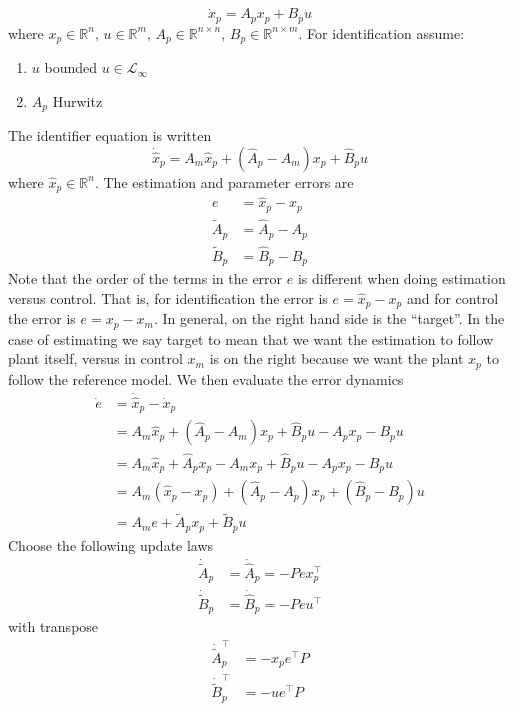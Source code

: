 \begin{equation*}
  \dot{x}_{p}=A_{p}x_{p}+B_{p}u
\end{equation*}
where $x_{p}\in\mathbb{R}^{n}$, $u\in\mathbb{R}^{m}$, $A_{p}\in\mathbb{R}^{n\times n}$, $B_{p}\in\mathbb{R}^{n\times m}$.
For identification assume:
\begin{enumerate}
  \setlength{\itemsep}{0pt}
  \item{$u$ bounded $u\in\mathcal{L}_{\infty}$}
  \item{$A_{p}$ Hurwitz}
\end{enumerate}
The identifier equation is written
\begin{equation*}
  \dot{\hat{x}}_{p}=A_{m}\hat{x}_{p}+(\hat{A}_{p}-A_{m})x_{p}+\hat{B}_{p}u
\end{equation*}
where $\hat{x}_{p}\in\mathbb{R}^{n}$.
The estimation and parameter errors are
\begin{align*}
  e&=\hat{x}_{p}-x_{p} \\
  \tilde{A}_{p}&=\hat{A}_{p}-A_{p} \\
  \tilde{B}_{p}&=\hat{B}_{p}-B_{p}
\end{align*}
Note that the order of the terms in the error $e$ is different when doing estimation versus control.
That is, for identification the error is $e=\hat{x}_{p}-x_{p}$ and for control the error is $e=x_{p}-x_{m}$.
In general, on the right hand side is the ``target''.
In the case of estimating we say target to mean that we want the estimation to follow plant itself, versus in control $x_{m}$ is on the right because we want the plant $x_{p}$ to follow the reference model.
We then evaluate the error dynamics
\begin{align*}
  \dot{e}&=\dot{\hat{x}}_{p}-\dot{x}_{p} \\
  &=A_{m}\hat{x}_{p}+(\hat{A}_{p}-A_{m})x_{p}+\hat{B}_{p}u-A_{p}x_{p}-B_{p}u \\
  &=A_{m}\hat{x}_{p}+\hat{A}_{p}x_{p}-A_{m}x_{p}+\hat{B}_{p}u-A_{p}x_{p}-B_{p}u \\
  &=A_{m}(\hat{x}_{p}-x_{p})+(\hat{A}_{p}-A_{p})x_{p}+(\hat{B}_{p}-B_{p})u \\
  &=A_{m}e+\tilde{A}_{p}x_{p}+\tilde{B}_{p}u
\end{align*}
Choose the following update laws
\begin{align*}
  \dot{\tilde{A}}_{p}&=\dot{\hat{A}}_{p}=-Pex_{p}^{\top} \\
  \dot{\tilde{B}}_{p}&=\dot{\hat{B}}_{p}=-Peu^{\top}
\end{align*}
with transpose
\begin{align*}
  \dot{\tilde{A}}_{p}^{\top}&=-x_{p}e^{\top}P \\
  \dot{\tilde{B}}_{p}^{\top}&=-ue^{\top}P
\end{align*}
